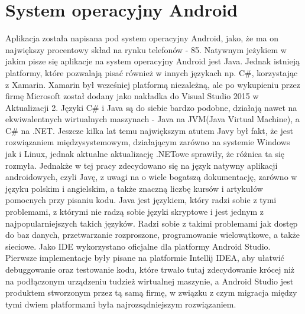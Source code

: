 \documentclass[eng,oneside]{mgr}
\begin{document}
\section{System operacyjny Android}
Aplikacja została napisana pod system operacyjny Android, jako, że ma on największy procentowy skład na rynku telefonów - 85\cite{procenty}. Natywnym jeżykiem w jakim pisze się aplikacje na system operacyjny Android jest Java. Jednak istnieją platformy, które pozwalają pisać również w innych językach np. C\#, korzystając z Xamarin. Xamarin był wcześniej platformą niezależną, ale po wykupieniu przez firmę Microsoft został dodany jako nakładka do Visual Studio 2015 w Aktualizacji 2. Języki C\# i Java są do siebie bardzo podobne, działają nawet na ekwiwalentnych wirtualnych maszynach - Java na JVM(Java Virtual Machine), a C\# na .NET. Jeszcze kilka lat temu największym atutem Javy był fakt, że jest rozwiązaniem międzysystemowym, działającym zarówno na systemie Windows jak i Linux\cite{thinking}, jednak aktualne aktualizację .NETowe sprawiły, że różnica ta się rozmyła. Jednakże w tej pracy zdecydowano się na język natywny aplikacji androidowych, czyli Javę, z uwagi na o wiele bogatszą dokumentację, zarówno w języku polskim i angielskim, a także znaczną liczbę kursów i artykułów pomocnych przy pisaniu kodu. Java jest językiem, który radzi sobie z tymi problemami, z którymi nie radzą sobie języki skryptowe i jest jednym z najpopularniejszych takich języków. Radzi sobie z takimi problemami jak dostęp do baz danych, przetwarzanie rozproszone, programowanie wielowątkowe, a także sieciowe\cite{java}. Jako IDE wykorzystano oficjalne dla platformy Android Studio. Pierwsze implementacje były pisane na platformie Intellij IDEA, aby ułatwić debuggowanie oraz testowanie kodu, które trwało tutaj zdecydowanie krócej niż na podłączonym urządzeniu tudzież wirtualnej maszynie, a Android Studio jest produktem stworzonym przez tą samą firmę, w związku z czym migracja między tymi dwiem platformami była najrozsądniejszym rozwiązaniem.
\end{document}
